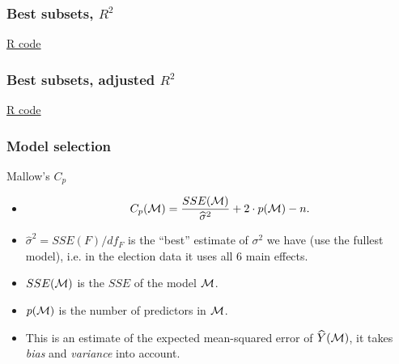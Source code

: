 \documentclass[handout]{beamer}
\begin{document}
   \begin{frame}
   \frametitle{Best subsets, $R^2$}
   \begin{center}
   \end{center}
   \href{http://stats191.stanford.edu/selection.html#election-example-best-subset}{R code}
   \end{frame}



   \begin{frame}
   \frametitle{Best subsets, adjusted $R^2$}
   \begin{center}
   \end{center}
   \href{http://stats191.stanford.edu/selection.html#election-example-best-subset}{R code}
   \end{frame}


   \begin{frame} \frametitle{Model selection}

   \begin{block}
   {Mallow's $C_p$}
   \begin{itemize}

   \item $$
   C_p({\cal M}) = \frac{SSE({\cal M})}{\widehat{\sigma}^2} + 2 \cdot p({\cal M}) - n.$$

   \item  $\widehat{\sigma}^2=SSE(F)/df_F$ is the ``best'' estimate of $\sigma^2$ we have (use the fullest model), i.e. in the election data it uses all 6 main effects.
   \item  $SSE({\cal M})$ is the $SSE$ of the model ${\cal M}$.

   \item  $p({\cal M})$ is the number of predictors in ${\cal M}$.


   \item This is an estimate of the expected mean-squared error of $\widehat{Y}({\cal M})$, it takes {\em bias} and {\em variance} into account.
   \end{itemize}
   \end{block}
   \end{frame}
\end{document}
